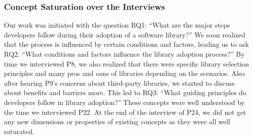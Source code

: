 \subsubsection{Concept Saturation over the Interviews}
%
Our work was initiated with the question RQ1: ``What are the major steps developers follow during their adoption of a software library?'' We soon realized that the process is influenced by certain conditions and factors, leading us to ask RQ2: ``What conditions and factors influence the library adoption process?'' 
By time we interviewed P8, we also realized that there were specific library selection principles and many pros and cons of libraries depending on the scenarios. Also after hearing P9's concerns about third-party libraries, we started to discuss about benefits and barriers more. This led to RQ3: ``What guiding principles do developers follow in library adoption?'' These concepts were well understood by the time we interviewed P22. At the end of the interview of P24, we did not get any new dimensions or properties of existing concepts as they were all well saturated.


